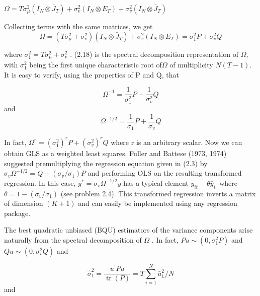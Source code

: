 \documentclass[
]{book}
\begin{document}
\(\Omega=T \sigma_{\mu}^{2}\left(I_{N} \otimes \bar{J}_{T}\right)+\sigma_{v}^{2}\left(I_{N} \otimes E_{T}\right)+\sigma_{v}^{2}\left(I_{N} \otimes \bar{J}_{T}\right)\)

Collecting terms with the same matrices, we get \begin{equation}
\Omega=\left(T \sigma_{\mu}^{2}+\sigma_{v}^{2}\right)\left(I_{N} \otimes \bar{J}_{T}\right)+\sigma_{v}^{2}\left(I_{N} \otimes E_{T}\right)=\sigma_{1}^{2} P+\sigma_{v}^{2} Q
\end{equation}

where \(\sigma_{1}^{2}=T \sigma_{\mu}^{2}+\sigma_{v}^{2}\) . (2.18) is the spectral decomposition representation of \(\Omega\), with \(\sigma_1^2\) being the first unique characteristic root of\(\Omega\) of multiplicity \(N(T − 1)\). It is easy to verify, using the properties of P and Q, that

\begin{equation}
\Omega^{-1}=\frac{1}{\sigma_{1}^{2}} P+\frac{1}{\sigma_{v}^{2}} Q
\end{equation} and \begin{equation}
\Omega^{-1 / 2}=\frac{1}{\sigma_{1}} P+\frac{1}{\sigma_{v}} Q
\end{equation}

In fact, \(\Omega^{r}=\left(\sigma_{1}^{2}\right)^{r} P+\left(\sigma_{v}^{2}\right)^{r} Q\) where r is an arbitrary scalar. Now we can obtain GLS as a weighted least squares. Fuller and Battese (1973, 1974) suggested premultiplying the regression equation given in (2.3) by \(\sigma_{v} \Omega^{-1 / 2}=Q+\left(\sigma_{v} / \sigma_{1}\right) P\) and performing OLS on the resulting transformed regression. In this case, \(y^{*}=\sigma_{v} \Omega^{-1 / 2} y\) has a typical element \(y_{i t}-\theta \bar{y}_{i .}\) where \(\theta=1-\left(\sigma_{v} / \sigma_{1}\right)\) (see problem 2.4). This transformed regression inverts a matrix of dimension \((K + 1)\) and can easily be implemented using any regression package.

The best quadratic unbiased (BQU) estimators of the variance components arise naturally from the spectral decomposition of \(\Omega\) . In fact, \(P u \sim\left(0, \sigma_{1}^{2} P\right)\) and \(Q u \sim\left(0, \sigma_{v}^{2} Q\right)\) and

\begin{equation}
\widehat{\sigma}_{1}^{2}=\frac{u^{\prime} P u}{\operatorname{tr}(P)}=T \sum_{i=1}^{N} \bar{u}_{i .}^{2} / N
\end{equation} and
\end{document}
